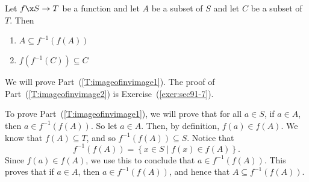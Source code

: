 %
\begin{theorem} \label{T:imageofinvimage}
Let $f\x S \to T$ be a function and let $A$ be a subset of $S$ and let $C$ be a subset of $T$.  Then
\begin{multicols}{2}
\begin{enumerate}
\item $A \subseteq f^{-1} \!\left( f ( A ) \right)$
\label{T:imageofinvimage1}

\item $f \!\left( f^{-1} ( C ) \right) \subseteq C$
\label{T:imageofinvimage2}
\end{enumerate}
\end{multicols}
\end{theorem}
%
\begin{myproof}
We will prove Part~(\ref{T:imageofinvimage1}).  The proof of 
Part~(\ref{T:imageofinvimage2}) is Exercise~(\ref{exer:sec91-7}).

To prove Part~(\ref{T:imageofinvimage1}), we will prove that for all $a \in S$, if $a \in A$, then \linebreak 
$a \in f^{-1} \!\left( f ( A ) \right)$.  So let $a \in A$.  Then, by definition, 
$f ( a ) \in f ( A )$.  We know that $f ( A ) \subseteq T$, and so 
$f^{-1} \!\left( f ( A ) \right) \subseteq S$.  Notice that
\[
f^{-1} \!\left( f ( A ) \right) = \left\{ x \in S \mid f ( x ) \in 
f ( A ) \right\}.
\]
Since $f ( a ) \in f ( A )$, we use this to conclude that 
$a \in f^{-1}\!\left ( f ( A ) \right)$.  This proves that if $a \in A$, then 
$a \in f^{-1} \!\left( f ( A ) \right)$, and hence that 
$A \subseteq f^{-1} \!\left( f ( A ) \right)$.
\end{myproof}
\hbreak

\endinput
